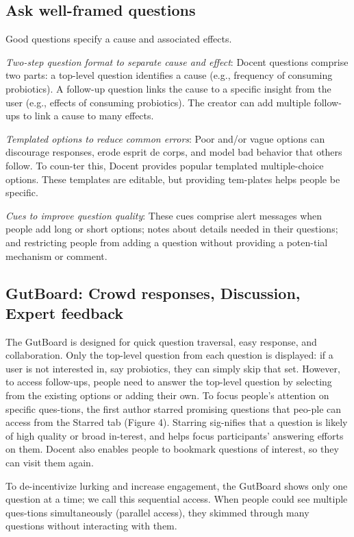 \subsection{Ask well-framed questions }
Good questions specify a cause and associated effects.

\textit{Two-step question format to separate cause and effect}: Docent questions comprise two parts: a top-level question identifies a cause (e.g., frequency of consuming probiotics). A follow-up question links the cause to a specific insight from the user (e.g., effects of consuming probiotics). The creator can add multiple follow-ups to link a cause to many effects.

\textit{Templated options to reduce common errors}: Poor and/or vague options can discourage responses, erode esprit de corps, and model bad behavior that others follow. To coun-ter this, Docent provides popular templated multiple-choice options. These templates are editable, but providing tem-plates helps people be specific.

\textit{Cues to improve question quality}: These cues comprise alert messages when people add long or short options; notes about details needed in their questions; and restricting people from adding a question without providing a poten-tial mechanism or comment.

\subsection{GutBoard: Crowd responses, Discussion, Expert feedback}
The GutBoard is designed for quick question traversal, easy response, and collaboration. Only the top-level question from each question is displayed: if a user is not interested in, say probiotics, they can simply skip that set. However, to access follow-ups, people need to answer the top-level question by selecting from the existing options or adding their own. To focus people’s attention on specific ques-tions, the first author starred promising questions that peo-ple can access from the Starred tab (Figure 4). Starring sig-nifies that a question is likely of high quality or broad in-terest, and helps focus participants’ answering efforts on them. Docent also enables people to bookmark questions of interest, so they can visit them again. 

To de-incentivize lurking and increase engagement, the GutBoard shows only one question at a time; we call this sequential access. When people could see multiple ques-tions simultaneously (parallel access), they skimmed through many questions without interacting with them. 

